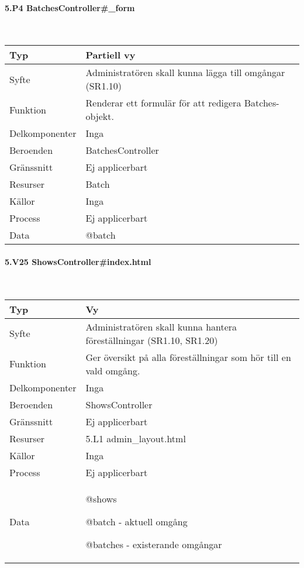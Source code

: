 \documentclass[a4paper, twoside, 11pt, titlepage]{article}
\begin{document}
			\paragraph{5.P4 BatchesController\#\_form}\

			\begin {table} [ht] \begin{tabular} {  p{3.5cm} p{9.6cm} }
				\hline
				{Typ} & {Partiell vy} \\
				\hline
				{Syfte} & {Administratören skall kunna lägga till omgångar (SR1.10)} \\
				\hline
				{Funktion} & {Renderar ett formulär för att redigera Batches-objekt.} \\
				\hline
				{Delkomponenter} & {Inga} \\
				\hline
				{Beroenden} & {BatchesController} \\
				\hline
				{Gränssnitt} & {Ej applicerbart} \\
				\hline
				{Resurser} & {Batch} \\
				\hline
				{Källor} & {Inga} \\
				\hline
				{Process} & {Ej applicerbart} \\
				\hline
				{Data} & {@batch} \\
				\hline
			\end{tabular} \end{table} \FloatBarrier


			\paragraph{5.V25 ShowsController\#index.html}\

			\begin {table} [ht] \begin{tabular} {  p{3.5cm} p{9.6cm} }
				\hline
				{Typ} & {Vy} \\
				\hline
				{Syfte} & {Administratören skall kunna hantera föreställningar (SR1.10, SR1.20)} \\
				\hline
				{Funktion} & {Ger översikt på alla föreställningar som hör till en vald omgång.} \\
				\hline
				{Delkomponenter} & {Inga} \\
				\hline
				{Beroenden} & {ShowsController} \\
				\hline
				{Gränssnitt} & {Ej applicerbart} \\
				\hline
				{Resurser} & {5.L1 admin\_layout.html} \\
				\hline
				{Källor} & {Inga} \\
				\hline
				{Process} & {Ej applicerbart} \\
				\hline
				{Data} & {@shows

@batch - aktuell omgång

@batches - existerande omgångar} \\
				\hline
			\end{tabular} \end{table} \FloatBarrier
\end{document}
